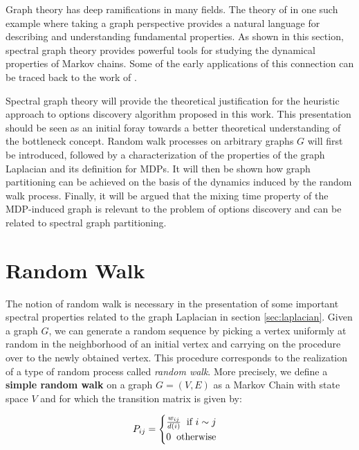 Graph theory has deep ramifications in many fields. The theory of \mdps in one such example where taking a graph perspective provides a natural language for describing and understanding fundamental properties. As shown in this section, spectral graph theory provides powerful
tools for studying the dynamical properties of Markov chains.  Some of the early
applications of this connection can be traced back to the work of \cite{SimonAndo1961, DonathHoffman1973, Fiedler1973}.

Spectral graph theory will provide the theoretical justification for the heuristic approach
to options discovery algorithm proposed in this work. This presentation should be seen
as an initial foray towards a better theoretical understanding of the bottleneck concept. Random walk  processes on arbitrary graphs
$G$ will first be introduced, followed by a characterization of the properties of the graph Laplacian and its definition for MDPs. It will then be shown how
graph partitioning can be achieved on the basis of the dynamics induced by the random
walk process. Finally, it will be argued that the mixing time property of the MDP-induced
graph is relevant to the problem of options discovery and can be related to spectral graph partitioning.

\section{Random Walk}
\label{sec:random-walk}
The notion of random walk is necessary in the presentation of some important spectral
properties related to the graph Laplacian in section \ref{sec:laplacian}. Given a graph
$G$, we can generate a random sequence by picking a vertex uniformly at
random in the neighborhood of an initial vertex and carrying on the procedure over to the
newly obtained vertex. This procedure corresponds to the realization of a type of
random process called \textit{random walk}. More precisely, we define a \textbf{simple
random walk} on a graph $G = (V, E)$ as a Markov Chain with state space $V$ and for
which the transition matrix is given by:

\begin{equation}
P_{ij} = \begin{cases} 
\frac{w_{ij}}{d(i)} \hspace{2mm} \mbox{if $i \sim j$} \\
0 \hspace{2mm} \mbox{otherwise}
\end{cases}
\end{equation}

